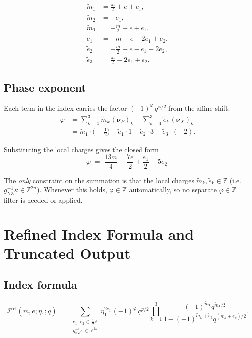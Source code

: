 \documentclass[11pt]{article}
\newcommand{\hZ}{\tfrac{1}{2}\mathbb{Z}}
\begin{document}
\begin{align*}
\widetilde{m}_1 &= \tfrac{m}{2} + e + e_1, \\
\widetilde{m}_2 &= -e_1, \\
\widetilde{m}_3 &= -\tfrac{m}{2} - e + e_1,\\[6pt]
\widetilde{e}_1 &= -m - e - 2e_1 + e_2, \\
\widetilde{e}_2 &= -\tfrac{m}{2} - e - e_1 + 2e_2, \\
\widetilde{e}_3 &= \tfrac{m}{2} - 2e_1 + e_2.
\end{align*}

\subsection{Phase exponent}

Each term in the index carries the factor $(-1)^{\varphi}\,q^{\varphi/2}$ from the
affine shift:
\begin{align*}
\varphi &= \sum_{k=1}^{3} \widetilde{m}_k\,(\boldsymbol{\nu}_P)_k
           - \sum_{k=1}^{3} \widetilde{e}_k\,(\boldsymbol{\nu}_X)_k \\
        &= \widetilde{m}_1\cdot\bigl(-\tfrac{1}{2}\bigr)
           - \widetilde{e}_1\cdot 1
           - \widetilde{e}_2\cdot 3
           - \widetilde{e}_3\cdot(-2).
\end{align*}

Substituting the local charges gives the closed form
\[
\varphi
\;=\;
\frac{13m}{4} + \frac{7e}{2} + \frac{e_1}{2} - 5e_2.
\]

The \emph{only} constraint on the summation is that the local charges
$\widetilde{m}_k, \widetilde{e}_k \in \mathbb{Z}$ (i.e.\ $g_{\mathrm{NZ}}^{-1}\kappa\in\mathbb{Z}^{2n}$).
Whenever this holds, $\varphi\in\mathbb{Z}$ automatically, so no separate
$\varphi\in\mathbb{Z}$ filter is needed or applied.

\section{Refined Index Formula and Truncated Output}

\subsection{Index formula}

\[
\mathcal{I}^{\mathrm{ref}}(m,e;\eta_1;q)
\;=\;
\sum_{\substack{e_1,\,e_2\,\in\,\hZ \\ g_{\mathrm{NZ}}^{-1}\kappa\,\in\,\mathbb{Z}^{2n}}}
\eta_1^{2e_1}\,(-1)^{\varphi}\,q^{\varphi/2}
\prod_{k=1}^{3}
\frac{(-1)^{\widetilde{m}_k} q^{\widetilde{m}_k/2}}
     {1 - (-1)^{\widetilde{m}_k+\widetilde{e}_k} q^{(\widetilde{m}_k+\widetilde{e}_k)/2}}.
\]
\end{document}
